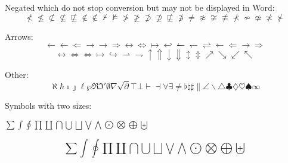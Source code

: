 Negated which do not stop conversion but may not be displayed in Word:
\begin{dmath}[compact,spread={1.250000\baselineskip}] \not< \not\leq \not\subset \not\subseteq \not\sqsubseteq \not\in \notin \not\vdash \not\models \not> \not\geq \not\supset \not\supseteq \not\sqsubseteq \not\ni \not= \not\approx \not\cong \not\equiv \not\prec \not\sim \not\simeq \not\asymp \not\succ  \end{dmath}


Arrows:
\begin{dmath}[compact,spread={1.250000\baselineskip}] \leftarrow \gets \Leftarrow \rightarrow \to \Rightarrow \leftrightarrow \Leftrightarrow \mapsto \hookleftarrow \leftharpoonup \leftharpoondown \rightleftharpoons \longleftarrow \Longleftarrow \longrightarrow \Longrightarrow  \end{dmath}
\begin{dmath}[compact,spread={1.250000\baselineskip}] \longleftrightarrow \Longleftrightarrow \iff \longmapsto \hookrightarrow \rightharpoonup \rightharpoondown \uparrow \Uparrow \downarrow \Downarrow \updownarrow \Updownarrow \nearrow \searrow \swarrow \nwarrow \end{dmath}

Other:
\begin{dmath}[compact,spread={1.250000\baselineskip}] \aleph \hbar \imath \jmath \ell \wp \Re \Im \prime \emptyset \nabla \surd \partial \top \bot \vdash \dashv \forall \exists \neq \flat \natural \sharp \| \angle \backslash \triangle \clubsuit \diamondsuit \heartsuit \spadesuit \infty \end{dmath}%

Symbols with two sizes: 
\begin{center}
\(\sum \int \oint \prod \coprod \bigcap \bigcup \bigsqcup \bigvee \bigwedge \bigodot \bigotimes \bigoplus \biguplus\)
\end{center}
\begin{dmath}[compact,spread={1.250000\baselineskip}] \sum \int \oint \prod \coprod \bigcap \bigcup \bigsqcup \bigvee \bigwedge \bigodot \bigotimes \bigoplus \biguplus \end{dmath}

